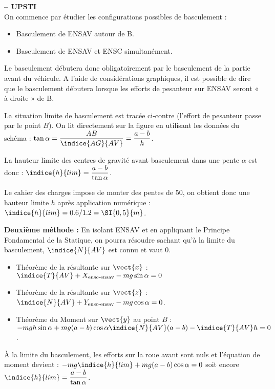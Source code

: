 \ifprof
\begin{corrige}\textbf{ -- UPSTI}\\ 
On commence par étudier les configurations possibles de basculement :
\begin{itemize}
\item Basculement de ENSAV autour de B.
\item Basculement de ENSAV et ENSC simultanément.
\end{itemize}


Le basculement débutera donc obligatoirement par le basculement de la partie avant du véhicule.
A l’aide de considérations graphiques, il est possible de dire que le basculement débutera lorsque les efforts de pesanteur sur ENSAV seront « à droite » de B.
 
La situation limite de basculement est tracée ci-contre (l’effort de pesanteur passe par le point $B$).
On lit directement sur la figure en utilisant les données du schéma :
$\tan\alpha = \dfrac{AB}{\indice{AG}{AV}} = \dfrac{a-b}{h}$.

La hauteur limite des centres de gravité avant basculement dans une pente $\alpha$ est donc :
$\indice{h}{lim}=\dfrac{a-b}{\tan \alpha}$.

Le cahier des charges impose de monter des pentes de 50\degres, on obtient donc une hauteur limite $h$ après application numérique : $\indice{h}{lim}=0.6/1.2=\SI{0,5}{m}$.

\textbf{Deuxième méthode : }
En isolant ENSAV et en appliquant le Principe Fondamental de la Statique, on pourra résoudre sachant qu’à la limite du basculement, $\indice{N}{AV}$ est connu et vaut 0.

\begin{itemize}
\item Théorème de la résultante sur $\vect{x}$ : $\indice{T}{AV}+X_{\text{ensc-ensav}}-mg \sin \alpha = 0$
\item Théorème de la résultante sur $\vect{z}$ : $\indice{N}{AV}+Y_{\text{ensc-ensav}}-mg \cos \alpha = 0$.
\item Théorème du Moment sur $\vect{y}$ au point $B$ : $ -mgh \sin \alpha +  mg(a-b) \cos\alpha \indice{N}{AV} (a-b)- \indice{T}{AV} h=0$.
\end{itemize}

À la limite du basculement, les efforts sur la roue avant sont nuls et l’équation de moment devient :
$-mg\indice{h}{lim} +mg(a-b) \cos\alpha = 0$ soit encore $\indice{h}{lim} = \dfrac{a-b}{\tan \alpha}$.
\end{corrige}
\else
\fi


